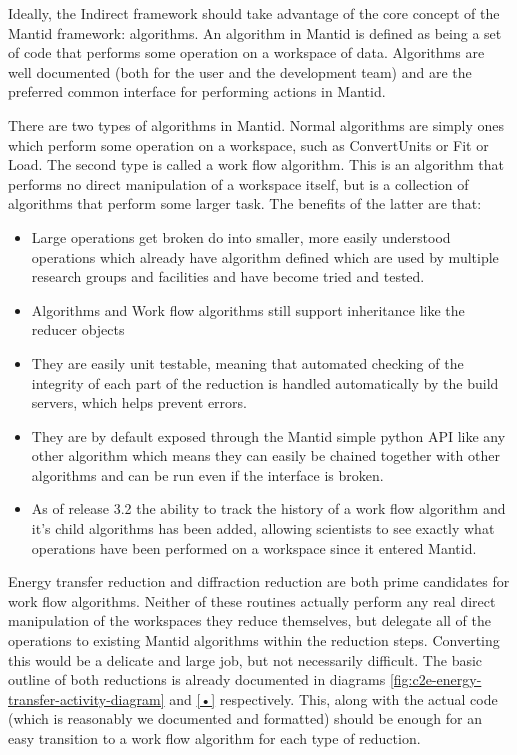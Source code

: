 \documentclass[paper=a4, fontsize=11pt]{scrartcl}	%
\numberwithin{equation}{section}															%
\numberwithin{figure}{section}																%
\numberwithin{table}{section}																%
\begin{document}
Ideally, the Indirect framework should take advantage of the core concept of the Mantid framework: algorithms. An algorithm in Mantid is defined as being a set of code that performs some operation on a workspace of data. Algorithms are well documented (both for the user and the development team) and are the preferred common interface for performing actions in Mantid.

There are two types of algorithms in Mantid. Normal algorithms are simply ones which perform some operation on a workspace, such as ConvertUnits or Fit or Load. The second type is called a work flow algorithm. This is an algorithm that performs no direct manipulation of a workspace itself, but is a collection of algorithms that perform some larger task. The benefits of the latter are that: 

\begin{itemize}
\item Large operations get broken do into smaller, more easily understood operations which already have algorithm defined which are used by multiple research groups and facilities and have become tried and tested.

\item Algorithms and Work flow algorithms still support inheritance like the reducer objects

\item They are easily unit testable, meaning that automated checking of the integrity of each part of the reduction is handled automatically by the build servers, which helps prevent errors.

\item They are by default exposed through the Mantid simple python API like any other algorithm which means they can easily be chained together with other algorithms and can be run even if the interface is broken.

\item As of release 3.2 the ability to track the history of a work flow algorithm and it's child algorithms has been added, allowing scientists to see exactly what operations have been performed on a workspace since it entered Mantid.
\end{itemize}

Energy transfer reduction and diffraction reduction are both prime candidates for work flow algorithms. Neither of these routines actually perform any real direct manipulation of the workspaces they reduce themselves, but delegate all of the operations to existing Mantid algorithms within the reduction steps. Converting this would be a delicate and large job, but not necessarily difficult. The basic outline of both reductions is already documented in diagrams \ref{fig:c2e-energy-transfer-activity-diagram} and \ref{•} respectively. This, along with the actual code (which is reasonably we documented and formatted) should be enough for an easy transition to a work flow algorithm for each type of reduction.
\end{document}
